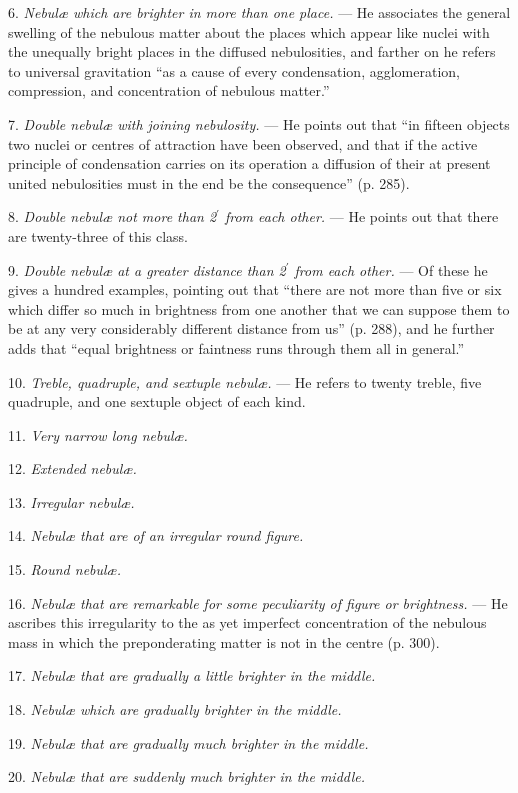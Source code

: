 \documentclass[a4paper, 12pt, oneside, polutonikogreek, english]{article}
\begin{document}
6. \emph{Nebulæ which are brighter in more than one place.} --- He associates the general swelling of the nebulous matter about the places which appear like nuclei with the unequally bright places in the diffused nebulosities, and farther on he refers to universal gravitation ``as a cause of every condensation, agglomeration, compression, and concentration of nebulous matter.''

7. \emph{Double nebulæ with joining nebulosity.} --- He points out that ``in fifteen objects two nuclei or centres of attraction have been observed, and that if the active principle of condensation carries on its operation a diffusion of their at present united nebulosities must in the end be the consequence'' (p. 285).

8. \emph{Double nebulæ not more than 2$^{\prime}$ from each other.} --- He points out that there are twenty-three of this class.

9. \emph{Double nebulæ at a greater distance than 2$^{\prime}$ from each other.} --- Of these he gives a hundred examples, pointing out that ``there are not more than five or six which differ so much in brightness from one another that we can suppose them to be at any very considerably different distance from us'' (p. 288), and he further adds that ``equal brightness or faintness runs through them all in general.''

10. \emph{Treble, quadruple, and sextuple nebulæ.} --- He refers to twenty treble, five quadruple, and one sextuple object of each kind.

11. \emph{Very narrow long nebulæ.}

12. \emph{Extended nebulæ.}

13. \emph{Irregular nebulæ.}

14. \emph{Nebulæ that are of an irregular round figure.}

15. \emph{Round nebulæ.}

16. \emph{Nebulæ that are remarkable for some peculiarity of figure or brightness.} --- He ascribes this irregularity to the as yet imperfect concentration of the nebulous mass in which the preponderating matter is not in the centre (p. 300).

17. \emph{Nebulæ that are gradually a little brighter in the middle.}

18. \emph{Nebulæ which are gradually brighter in the middle.}

19. \emph{Nebulæ that are gradually much brighter in the middle.}

20. \emph{Nebulæ that are suddenly much brighter in the middle.}
\end{document}

